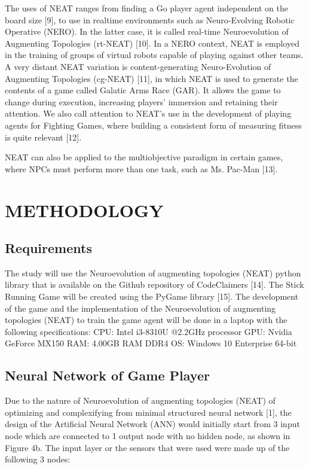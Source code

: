 \documentclass[journal]{IEEEtran}
\begin{document}
The uses of NEAT ranges from finding a Go player
agent independent on the board size [9], to use in realtime
environments such as Neuro-Evolving Robotic Operative
(NERO). In the latter case, it is called real-time
Neuroevolution of Augmenting Topologies (rt-NEAT) [10].
In a NERO context, NEAT is employed in the training of
groups of virtual robots capable of playing against other
teams. A very distant NEAT variation is content-generating
Neuro-Evolution of Augmenting Topologies (cg-NEAT) [11],
in which NEAT is used to generate the contents of a game
called Galatic Arms Race (GAR). It allows the game to
change during execution, increasing players’ immersion and
retaining their attention. We also call attention to NEAT’s
use in the development of playing agents for Fighting
Games, where building a consistent form of measuring
fitness is quite relevant [12].

NEAT can also be applied to the multiobjective paradigm
in certain games, where NPCs must perform more than one
task, such as Ms. Pac-Man [13].

\section{METHODOLOGY}

\subsection{Requirements}

The study will use the Neuroevolution of augmenting topologies (NEAT) python library that is available on the Github repository of CodeClaimers [14]. The Stick Running Game will be created using the PyGame library [15]. The development of the game and the implementation of the Neuroevolution of augmenting topologies (NEAT) to train the game agent will be done in a laptop with the following specifications:
CPU: Intel i3-8310U @2.2GHz processor
GPU: Nvidia GeForce MX150
RAM: 4.00GB RAM DDR4 
OS: Windows 10 Enterprise 64-bit

\subsection{Neural Network of Game Player}

Due to the nature of Neuroevolution of augmenting topologies (NEAT) of optimizing and complexifying from minimal structured neural network [1], the design of the Artificial Neural Network (ANN) would initially start from 3 input node which are connected to 1 output node with no hidden node, as shown in Figure 4b. The input layer or the sensors that were used were made up of the following 3 nodes:
\end{document}
